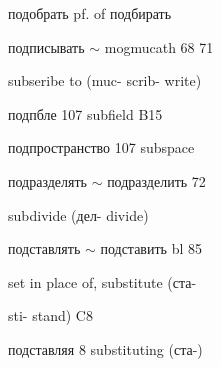 \begin{minipage}[t]{0.475\textwidth}
\noindent подобрать pf. of подбирать\par
\noindent подписывать $\sim$ mogmucath 68 71\par
\noindent subseribe to (muc- scrib- write)\par
{} подпбле 107 subfield B15\par
\noindent подпространство 107 subspace\par
\noindent подразделять $\sim$ подразделить 72\par
\noindent subdivide (дел- divide)\par
\noindent подставлять $\sim$ подставить bl 85\par
\noindent set in place of, substitute (ста-\par
\noindent sti- stand) C8\par
\noindent подставляя 8 substituting (ста-)\par
\end{minipage}
\endgroup

